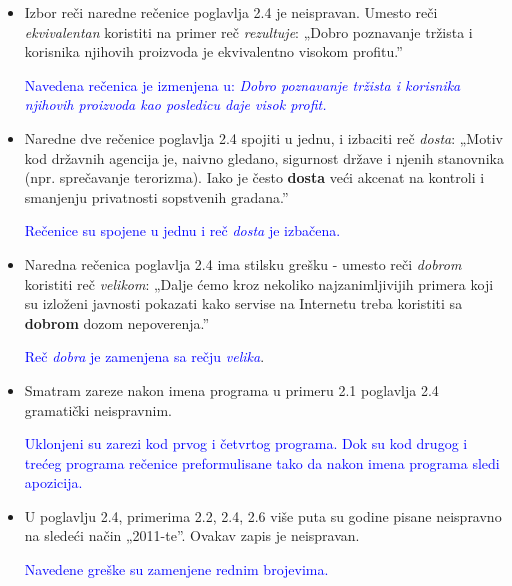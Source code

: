 \documentclass[a4paper]{report}
\newcommand{\odgovor}[1]{\textcolor{blue}{#1}}
\begin{document}
\begin{itemize}
    \item Izbor reči naredne rečenice poglavlja 2.4 je neispravan. Umesto reči  \textit{ekvivalentan} koristiti na primer reč \textit{rezultuje}:\newline
    „Dobro poznavanje tržista i korisnika njihovih proizvoda je ekvivalentno visokom profitu.”
    
    \odgovor{Navedena rečenica je izmenjena u: \newline
    \textit{Dobro poznavanje tržista i korisnika njihovih proizvoda kao posledicu daje visok profit.}}
        
\end{itemize}
\begin{itemize}
    \item Naredne dve rečenice poglavlja 2.4 spojiti u jednu, i izbaciti reč  \textit{dosta}: \newline
    „Motiv kod državnih agencija je, naivno gledano, sigurnost države i njenih stanovnika (npr. sprečavanje terorizma). Iako je često  \textbf{dosta} veći akcenat na kontroli i smanjenju privatnosti sopstvenih gradana.”
    
    \odgovor{Rečenice su spojene u jednu i reč \textit{dosta} je izbačena.}
    
\end{itemize}
\begin{itemize}
    \item Naredna rečenica poglavlja 2.4 ima stilsku grešku - umesto reči \textit{dobrom} koristiti reč \textit{velikom}: \newline
    „Dalje ćemo kroz nekoliko najzanimljivijih primera koji su izloženi javnosti pokazati kako servise na Internetu treba koristiti sa \textbf{dobrom} dozom nepoverenja.”
    
    \odgovor{Reč \textit{dobra} je zamenjena sa rečju \textit{velika}}.
    
\end{itemize}
\begin{itemize}
    \item Smatram zareze nakon imena programa u primeru 2.1 poglavlja 2.4 gramatički neispravnim. 
    
    \odgovor{Uklonjeni su zarezi kod prvog i četvrtog programa. Dok su kod drugog i trećeg programa rečenice preformulisane tako da nakon imena programa sledi apozicija.}
    
\end{itemize}
\begin{itemize}
    \item  U poglavlju 2.4, primerima 2.2, 2.4, 2.6 više puta su godine pisane neispravno na sledeći način „2011-te”. Ovakav zapis je neispravan.
    
    \odgovor{Navedene greške su zamenjene rednim brojevima.}
    
\end{itemize}
\end{document}
